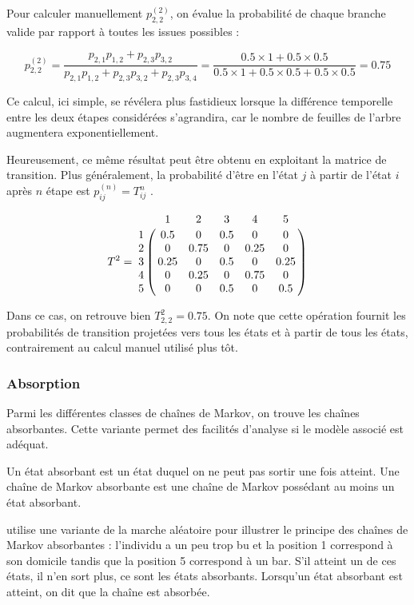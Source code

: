 \documentclass[12pt]{article}
\begin{document}
Pour calculer manuellement $p^{(2)}_{2,2}$, on évalue la probabilité
de chaque branche valide par rapport à toutes les issues possibles :

$$
p^{(2)}_{2,2}
= \frac{p_{2,1} p_{1,2} + p_{2,3} p_{3,2}}{p_{2,1} p_{1,2} + p_{2,3} p_{3,2} + p_{2,3} p_{3,4}}
= \frac{0.5 \times 1 + 0.5 \times 0.5}{0.5 \times 1 + 0.5 \times 0.5 + 0.5 \times 0.5}
= 0.75
$$
\vspace{0.5cm}

Ce calcul, ici simple, se révélera plus fastidieux lorsque la
différence temporelle entre les deux étapes considérées s'agrandira,
car le nombre de feuilles de l'arbre augmentera exponentiellement.

Heureusement, ce même résultat peut être obtenu en exploitant la
matrice de transition. Plus généralement, la probabilité d'être en
l'état $j$ à partir de l'état $i$ après $n$ étape est $p^{(n)}_{ij} =
T^n_{ij}$ \cite{snell}.

$$
T^2 = \bordermatrix{
    & 1 & 2 & 3 & 4 & 5 \cr
  1 & 0.5 & 0 & 0.5 & 0 & 0 \cr
  2 & 0 & 0.75 & 0 & 0.25 & 0 \cr
  3 & 0.25 & 0 & 0.5 & 0 & 0.25 \cr
  4 & 0 & 0.25 & 0 & 0.75 & 0 \cr
  5 & 0 & 0 & 0.5 & 0 & 0.5 \cr
}
$$
\vspace{0.5cm}

Dans ce cas, on retrouve bien $T^2_{2,2} = 0.75$. On note que cette
opération fournit les probabilités de transition projetées vers tous
les états et à partir de tous les états, contrairement au calcul
manuel utilisé plus tôt.

\subsubsection{Absorption}

Parmi les différentes classes de chaînes de Markov, on trouve les
chaînes absorbantes. Cette variante permet des facilités d'analyse si
le modèle associé est adéquat.

Un état absorbant est un état duquel on ne peut pas sortir une fois
atteint. Une chaîne de Markov absorbante est une chaîne de Markov
possédant au moins un état absorbant.

\cite{snell} utilise une variante de la marche aléatoire pour
illustrer le principe des chaînes de Markov absorbantes : l'individu a
un peu trop bu et la position 1 correspond à son domicile tandis que
la position 5 correspond à un bar. S'il atteint un de ces états, il
n'en sort plus, ce sont les états absorbants. Lorsqu'un état absorbant
est atteint, on dit que la chaîne est absorbée.
\end{document}
